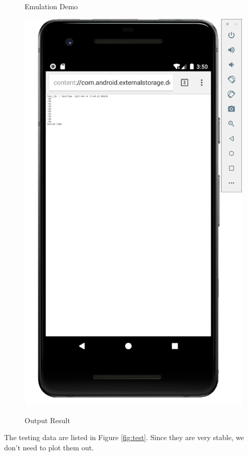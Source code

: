 \begin{figure}[t]
\begin{minipage}[t]{0.48\linewidth}
  \caption{Emulation Demo}
    \end{minipage}
    \begin{minipage}[t]{0.48\linewidth}
    \centering
    \label{fig:test2}
    \includegraphics[width=0.8\columnwidth]{img/test2.png} 
    \caption{Output Result}
    \end{minipage}
\end{figure}

The testing data are listed in Figure \ref{fig:test}. Since they are very stable, we don't need to plot them out.

